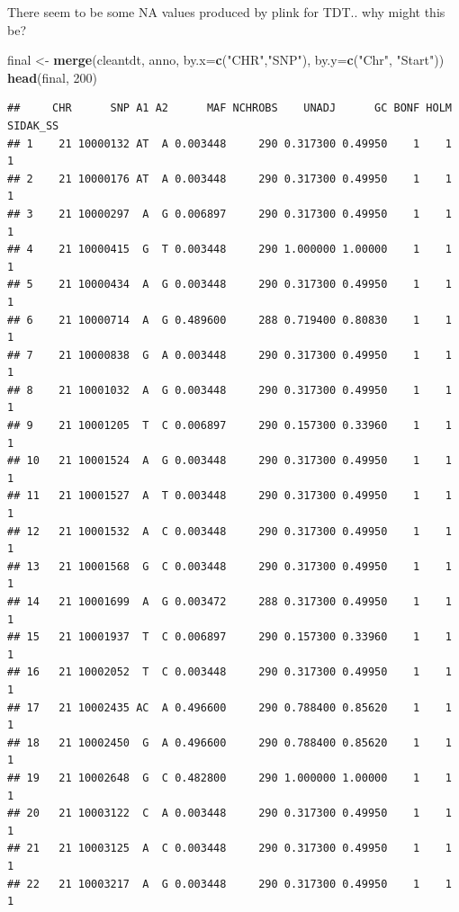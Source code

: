\documentclass[
]{article}
\newenvironment{Shaded}{\begin{snugshade}}{\end{snugshade}}
\newcommand{\DataTypeTok}[1]{\textcolor[rgb]{0.13,0.29,0.53}{#1}}
\newcommand{\DecValTok}[1]{\textcolor[rgb]{0.00,0.00,0.81}{#1}}
\newcommand{\KeywordTok}[1]{\textcolor[rgb]{0.13,0.29,0.53}{\textbf{#1}}}
\newcommand{\NormalTok}[1]{#1}
\newcommand{\StringTok}[1]{\textcolor[rgb]{0.31,0.60,0.02}{#1}}
\begin{document}
There seem to be some NA values produced by plink for TDT.. why might
this be?

\begin{Shaded}
\begin{Highlighting}[]
\NormalTok{final <-}\StringTok{ }\KeywordTok{merge}\NormalTok{(cleantdt, anno, }\DataTypeTok{by.x=}\KeywordTok{c}\NormalTok{(}\StringTok{"CHR"}\NormalTok{,}\StringTok{"SNP"}\NormalTok{), }\DataTypeTok{by.y=}\KeywordTok{c}\NormalTok{(}\StringTok{"Chr"}\NormalTok{, }\StringTok{"Start"}\NormalTok{))}
\KeywordTok{head}\NormalTok{(final, }\DecValTok{200}\NormalTok{)}
\end{Highlighting}
\end{Shaded}

\begin{verbatim}
##     CHR      SNP A1 A2      MAF NCHROBS    UNADJ      GC BONF HOLM SIDAK_SS
## 1    21 10000132 AT  A 0.003448     290 0.317300 0.49950    1    1        1
## 2    21 10000176 AT  A 0.003448     290 0.317300 0.49950    1    1        1
## 3    21 10000297  A  G 0.006897     290 0.317300 0.49950    1    1        1
## 4    21 10000415  G  T 0.003448     290 1.000000 1.00000    1    1        1
## 5    21 10000434  A  G 0.003448     290 0.317300 0.49950    1    1        1
## 6    21 10000714  A  G 0.489600     288 0.719400 0.80830    1    1        1
## 7    21 10000838  G  A 0.003448     290 0.317300 0.49950    1    1        1
## 8    21 10001032  A  G 0.003448     290 0.317300 0.49950    1    1        1
## 9    21 10001205  T  C 0.006897     290 0.157300 0.33960    1    1        1
## 10   21 10001524  A  G 0.003448     290 0.317300 0.49950    1    1        1
## 11   21 10001527  A  T 0.003448     290 0.317300 0.49950    1    1        1
## 12   21 10001532  A  C 0.003448     290 0.317300 0.49950    1    1        1
## 13   21 10001568  G  C 0.003448     290 0.317300 0.49950    1    1        1
## 14   21 10001699  A  G 0.003472     288 0.317300 0.49950    1    1        1
## 15   21 10001937  T  C 0.006897     290 0.157300 0.33960    1    1        1
## 16   21 10002052  T  C 0.003448     290 0.317300 0.49950    1    1        1
## 17   21 10002435 AC  A 0.496600     290 0.788400 0.85620    1    1        1
## 18   21 10002450  G  A 0.496600     290 0.788400 0.85620    1    1        1
## 19   21 10002648  G  C 0.482800     290 1.000000 1.00000    1    1        1
## 20   21 10003122  C  A 0.003448     290 0.317300 0.49950    1    1        1
## 21   21 10003125  A  C 0.003448     290 0.317300 0.49950    1    1        1
## 22   21 10003217  A  G 0.003448     290 0.317300 0.49950    1    1        1

\end{verbatim}
\end{document}
